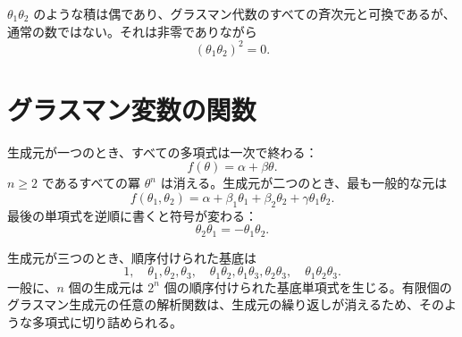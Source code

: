 \(\theta_1\theta_2\) のような積は偶であり、グラスマン代数のすべての斉次元と可換であるが、通常の数ではない。それは非零でありながら
\begin{equation}
(\theta_1\theta_2)^2=0.
\end{equation}

\begin{classroomqa}
\end{classroomqa}

\section{グラスマン変数の関数}

生成元が一つのとき、すべての多項式は一次で終わる：
\begin{equation}
f(\theta)=\alpha+\beta\theta.
\end{equation}
\(n\geq2\) であるすべての冪 \(\theta^n\) は消える。生成元が二つのとき、最も一般的な元は
\begin{equation}
f(\theta_1,\theta_2)
=\alpha+\beta_1\theta_1+\beta_2\theta_2
+\gamma\theta_1\theta_2.
\end{equation}
最後の単項式を逆順に書くと符号が変わる：
\begin{equation}
\theta_2\theta_1=-\theta_1\theta_2.
\end{equation}

\begin{classroomqa}
\end{classroomqa}

生成元が三つのとき、順序付けられた基底は
\begin{equation}
1,\quad
\theta_1,\theta_2,\theta_3,\quad
\theta_1\theta_2,\theta_1\theta_3,\theta_2\theta_3,\quad
\theta_1\theta_2\theta_3.
\end{equation}
一般に、\(n\) 個の生成元は \(2^n\) 個の順序付けられた基底単項式を生じる。有限個のグラスマン生成元の任意の解析関数は、生成元の繰り返しが消えるため、そのような多項式に切り詰められる。

